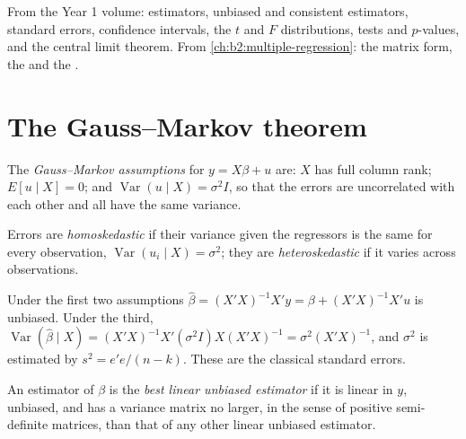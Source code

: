 \begin{recall}
From the Year 1 volume: estimators, unbiased and consistent estimators, standard errors, confidence intervals, the $t$ and
$F$ distributions, tests and $p$-values, and the central limit theorem. From \cref{ch:b2:multiple-regression}: the
matrix form, the  and the .
\end{recall}

\section{The Gauss--Markov theorem}\label{sec:b2:regression-inference:gm}

\begin{definition}\label{def:b2:regression-inference:gm-assumptions}
The \emph{Gauss--Markov assumptions} for $y = X\beta + u$ are: $X$ has full column rank;
$E[u \mid X] = 0$; and $\operatorname{Var}(u \mid X) = \sigma^2I$, so that the errors are uncorrelated with each other and
all have the same variance.
\end{definition}

\begin{definition}[Homoskedasticity]\label{def:b2:regression-inference:homoskedasticity}
Errors are \emph{homoskedastic} if their variance given the regressors is the same for every
observation, $\operatorname{Var}(u_i \mid X) = \sigma^2$; they are \emph{heteroskedastic} if it
varies across observations.
\end{definition}

Under the first two assumptions $\hat\beta = (X'X)^{-1}X'y = \beta + (X'X)^{-1}X'u$ is unbiased. Under the third,
$\operatorname{Var}(\hat\beta \mid X) = (X'X)^{-1}X'(\sigma^2I)X(X'X)^{-1} = \sigma^2(X'X)^{-1}$, and $\sigma^2$ is
estimated by $s^2 = e'e/(n - k)$. These are the classical standard errors.

\begin{definition}\label{def:b2:regression-inference:blue}
An estimator of $\beta$ is the \emph{best linear unbiased estimator} if it is linear
in $y$, unbiased, and has a variance matrix no larger, in the sense of positive semi-definite matrices, than that of any
other linear unbiased estimator.
\end{definition}

